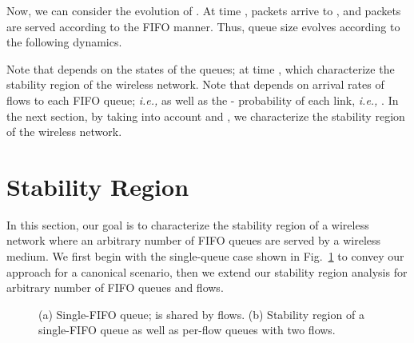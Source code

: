 \documentclass[conference]{IEEEtran}
\newcommand{\ie}{{\em i.e., }}
\begin{document}
Now, we can consider the evolution of . At time ,  packets arrive to , and  packets are served according to the FIFO manner. Thus, queue size  evolves according to the following dynamics.
 
Note that  depends on the states of the queues;  at time , which characterize the stability region of the wireless network.  Note that  depends on arrival rates of flows to each FIFO queue; \ie  as well as the - probability of each link, \ie . In the next section, by taking into account  and , we characterize the stability region of the wireless network.


\section{Stability Region} \label{sec:stability_region}
In this section, our goal is to characterize the stability region of a wireless network where an arbitrary number of FIFO queues are served by a wireless medium. We first begin with the single-queue case shown in Fig.~\ref{fig:FIFO_one_queue_fig} to convey our approach for a canonical scenario, then we extend our stability region analysis for arbitrary number of FIFO queues and flows.

\begin{figure}
\centering
{} \hspace{5pt}
\vspace{-10pt}
\caption{(a) Single-FIFO queue;  is shared by  flows. (b) Stability region of a single-FIFO queue as well as per-flow queues with two flows.}
\label{fig:FIFO_one_queue_fig}
\vspace{-5pt}
\end{figure}
\end{document}

